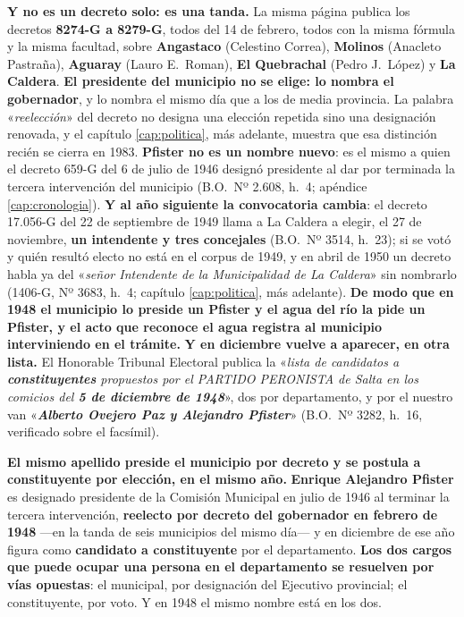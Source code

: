 \begin{cautela}
\textbf{Y no es un decreto solo: es una tanda.} La misma página publica los decretos
\textbf{8274-G a 8279-G}, todos del 14 de febrero, todos con la misma fórmula y la misma
facultad, sobre \textbf{Angastaco} (Celestino Correa), \textbf{Molinos} (Anacleto
Pastraña), \textbf{Aguaray} (Lauro E.\ Roman), \textbf{El Quebrachal} (Pedro J.\ López) y
\textbf{La Caldera}. \textbf{El presidente del municipio no se elige: lo nombra el
gobernador}, y lo nombra el mismo día que a los de media provincia. La palabra
«\textit{reelección}» del decreto no designa una elección repetida sino una designación
renovada, y el capítulo \ref{cap:politica}, más adelante, muestra que esa distinción recién se cierra en
1983. \textbf{Pfister no es un nombre nuevo}: es el mismo a quien el decreto 659-G del 6
de julio de 1946 designó presidente al dar por terminada la tercera intervención del
municipio (B.O.\ Nº 2.608, h.\ 4; apéndice \ref{cap:cronologia}). \textbf{Y al año siguiente la convocatoria cambia}: el decreto 17.056-G del 22 de septiembre
de 1949 llama a La Caldera a elegir, el 27 de noviembre, \textbf{un intendente y tres concejales}
(B.O.\ Nº 3514, h.\ 23); si se votó y quién resultó electo no está en el corpus de 1949, y en abril
de 1950 un decreto habla ya del «\textit{señor Intendente de la Municipalidad de La Caldera}» sin
nombrarlo (1406-G, Nº 3683, h.\ 4; capítulo \ref{cap:politica}, más adelante). \textbf{De modo que en 1948 el municipio lo
preside un Pfister y el agua del río la pide un Pfister, y el acto que reconoce el agua
registra al municipio interviniendo en el trámite.} \textbf{Y en diciembre vuelve a aparecer, en otra lista.} El Honorable Tribunal Electoral
publica la «\textit{lista de candidatos a \textbf{constituyentes} propuestos por el PARTIDO
PERONISTA de Salta en los comicios del \textbf{5 de diciembre de 1948}}», dos por
departamento, y por el nuestro van «\textit{\textbf{Alberto Ovejero Paz y Alejandro
Pfister}}» (B.O.\ Nº 3282, h.\ 16, verificado sobre el facsímil).

\begin{cautela}
\textbf{El mismo apellido preside el municipio por decreto y se postula a constituyente por
elección, en el mismo año.} \textbf{Enrique Alejandro Pfister} es designado presidente de la
Comisión Municipal en julio de 1946 al terminar la tercera intervención, \textbf{reelecto por
decreto del gobernador en febrero de 1948} ---en la tanda de seis municipios del mismo día---
y en diciembre de ese año figura como \textbf{candidato a constituyente} por el departamento.
\textbf{Los dos cargos que puede ocupar una persona en el departamento se resuelven por vías
opuestas}: el municipal, por designación del Ejecutivo provincial; el constituyente, por
voto. Y en 1948 el mismo nombre está en los dos.


\end{cautela}
\end{cautela}
